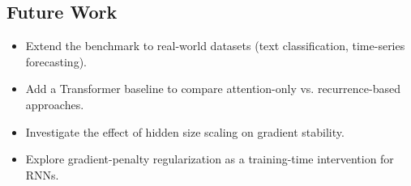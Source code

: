 \documentclass[12pt, a4paper]{article}
\begin{document}
\subsection{Future Work}

\begin{itemize}[leftmargin=2em]
    \item Extend the benchmark to real-world datasets (text classification, time-series forecasting).
    \item Add a Transformer baseline to compare attention-only vs. recurrence-based approaches.
    \item Investigate the effect of hidden size scaling on gradient stability.
    \item Explore gradient-penalty regularization as a training-time intervention for RNNs.
\end{itemize}
\end{document}
